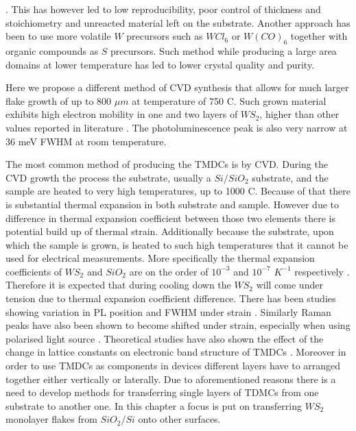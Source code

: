 \cite{doi:10.1021/nn4046002}\cite{Li2015}\cite{Gao2015}\cite{Cong2013}\cite{Yun2015}\cite{Gong2015}\cite{Gong2014}. This has however led to low reproducibility, poor control of thickness and stoichiometry and unreacted material left on the substrate. Another approach has been to use more volatile $W$ precursors such as $WCl_6$\cite{Carmalt2003} or $W(CO)_6$\cite{Kang2015}\cite{Eichfeld2015} together with organic compounds as $S$ precursors. Such method while producing a large area domains at lower temperature has led to lower crystal quality and purity.

Here we propose a different method of CVD synthesis that allows for much larger flake growth of up to 800 $\mu m$ at temperature of 750 {\degree}C. Such grown material exhibits high electron mobility in one and two layers of $WS_2$, higher than other values reported in literature \cite{Yun2015}\cite{Iqbal2015a}. The photoluminescence peak is also very narrow at 36 meV FWHM at room temperature.

The most common method of producing the TMDCs is by CVD. During the CVD growth the process the substrate, usually a $Si/SiO_2$ substrate, and the sample are heated to very high temperatures, up to 1000 {\degree}C. Because of that there is substantial thermal expansion in both substrate and sample. However due to difference in thermal expansion coefficient between those two elements there is potential build up of thermal strain. Additionally because the substrate, upon which the sample is grown, is heated to such high temperatures that it cannot be used for electrical measurements. More specifically the thermal expansion coefficients of $WS_2$ and $SiO_2$ are on the order of $10^{-3}$ and $10^{-7}$ $K^{-1}$ respectively \cite{Hu2018}\cite{Tada2000}. Therefore it is expected that during cooling down the $WS_2$ will come under tension due to thermal expansion coefficient difference. There has been studies showing variation in PL position and FWHM under strain \cite{Aslan2018}. Similarly Raman peaks have also been shown to become shifted under strain, especially when using polarised light source \cite{Dadgar2018}. Theoretical studies have also shown the effect of the change in lattice constants on electronic band structure of TMDCs \cite{Yun2012}. Moreover in order to use TMDCs as components in devices different layers have to arranged together either vertically or laterally. Due to aforementioned reasons there is a need to develop methods for transferring single layers of TDMCs from one substrate to another one. In this chapter a focus is put on transferring $WS_2$ monolayer flakes from $SiO_2/Si$ onto other surfaces.

